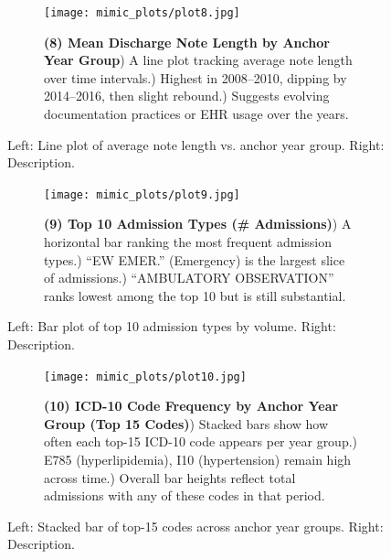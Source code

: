 \documentclass[12pt,a4paper]{report}
\begin{document}
\begin{figure}[ht!]
    \centering
    \begin{subfigure}{0.42\textwidth}
        \texttt{[image: mimic\_plots/plot8.jpg]}
    \end{subfigure}\hfill
    \begin{subfigure}{0.54\textwidth}
        \footnotesize
        \textbf{(8) Mean Discharge Note Length by Anchor Year Group}) A line plot tracking average note length over time intervals.) Highest in 2008--2010, dipping by 2014--2016, then slight rebound.) Suggests evolving documentation practices or EHR usage over the years.
    \end{subfigure}
    \caption{Left: Line plot of average note length vs. anchor year group. Right: Description.}
    \label{fig:plot8}
\end{figure}

\begin{figure}[ht!]
    \centering
    \begin{subfigure}{0.42\textwidth}
        \texttt{[image: mimic\_plots/plot9.jpg]}
    \end{subfigure}\hfill
    \begin{subfigure}{0.54\textwidth}
        \footnotesize
        \textbf{(9) Top 10 Admission Types (\# Admissions)}) A horizontal bar ranking the most frequent admission types.) “EW EMER.” (Emergency) is the largest slice of admissions.) “AMBULATORY OBSERVATION” ranks lowest among the top 10 but is still substantial.
    \end{subfigure}
    \caption{Left: Bar plot of top 10 admission types by volume. Right: Description.}
    \label{fig:plot9}
\end{figure}

\begin{figure}[ht!]
    \centering
    \begin{subfigure}{0.42\textwidth}
        \texttt{[image: mimic\_plots/plot10.jpg]}
    \end{subfigure}\hfill
    \begin{subfigure}{0.54\textwidth}
        \footnotesize
        \textbf{(10) ICD-10 Code Frequency by Anchor Year Group (Top 15 Codes)}) Stacked bars show how often each top-15 ICD-10 code appears per year group.) E785 (hyperlipidemia), I10 (hypertension) remain high across time.) Overall bar heights reflect total admissions with any of these codes in that period.
    \end{subfigure}
    \caption{Left: Stacked bar of top-15 codes across anchor year groups. Right: Description.}
    \label{fig:plot10}
\end{figure}
\end{document}
